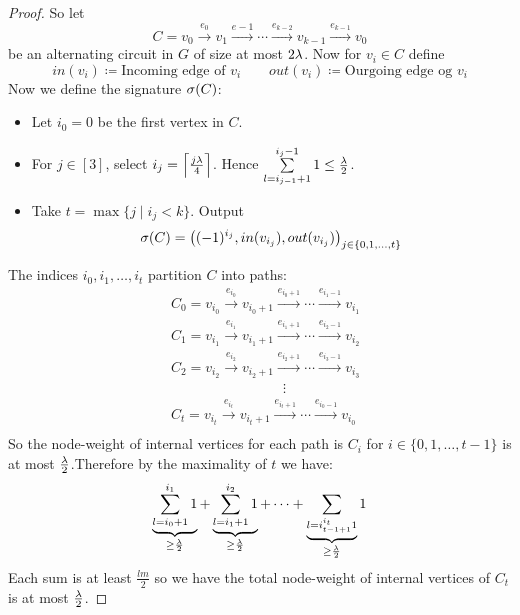 \begin{proof}
	So let $$C=v_0\overset{e_0}{\longrightarrow} v_1\overset{e-1}{\longrightarrow}\cdots \overset{e_{k-2}}{\longrightarrow}v_{k-1}\overset{e_{k-1}}{\longrightarrow}v_0$$be an alternating circuit in $G$ of size at most $2\lambda$. Now for $v_i\in C$ define $$ in(v_i)\coloneqq \text{Incoming edge of $v_i$}\qquad out(v_i)\coloneqq\text{Ourgoing edge og $v_i$}$$Now we define the signature $\sigma(C)$:\begin{itemize}
		\item Let $i_0=0$ be the first vertex in $C$.
		\item For $j\in [3]$, select $i_j=\left\lceil \frac{j\lambda}{4} \right\rceil $. Hence $\sum\limits_{l=i_{j-1}+1}^{i_j-1}1\leq \frac{\lambda}2$.
		\item Take $t=\max\{j\mid i_j<k\}$. Output $$\sigma(C)=\left( (-1)^{i_j},in(v_{i_j}), out(v_{i_j}) \right)_{j\in \{0,1,\dots,t\}}$$
	\end{itemize}
	The indices $i_0,i_1,\dots,i_t$ partition $C$ into paths:
	\begin{align*}
		 & C_0= v_{i_0}\overset{e_{i_0}}{\longrightarrow}v_{i_0+1}\overset{e_{i_0+1}}{\longrightarrow} \cdots \overset{e_{i_1-1}}{\longrightarrow}v_{i_1} \\
		 & C_1= v_{i_1}\overset{e_{i_1}}{\longrightarrow}v_{i_1+1}\overset{e_{i_1+1}}{\longrightarrow} \cdots \overset{e_{i_2-1}}{\longrightarrow}v_{i_2} \\
		 & C_2= v_{i_2}\overset{e_{i_2}}{\longrightarrow}v_{i_2+1}\overset{e_{i_2+1}}{\longrightarrow} \cdots \overset{e_{i_3-1}}{\longrightarrow}v_{i_3} \\
		 & \qquad\qquad\qquad\qquad\vdots                                                                                                                 \\
		 & C_t= v_{i_t}\overset{e_{i_t}}{\longrightarrow}v_{i_t+1}\overset{e_{i_t+1}}{\longrightarrow} \cdots \overset{e_{i_0-1}}{\longrightarrow}v_{i_0} \\
	\end{align*}So the node-weight of internal vertices for each path is $C_i$ for $i\in \{0,1,\dots,t-1\}$ is at most $ \frac{\lambda}2$.Therefore by the maximality of $t$ we have:
	$$\underbrace{\sum\limits_{l=i_0+1}^{i_1}1}_{\geq \frac{\lambda}{2}} + \underbrace{\sum\limits_{l=i_1+1}^{i_2}1}_{\geq \frac{\lambda}{2}} + \cdots + \underbrace{\sum\limits_{l=i_{t-1+1}^{i_t}1}}_{\geq \frac{\lambda}{2}}1$$Each sum is at least $\frac{lm}{2}$ so we have the total node-weight of internal vertices of $C_t$ is at most $\frac{\lambda}2$.


\end{proof}
